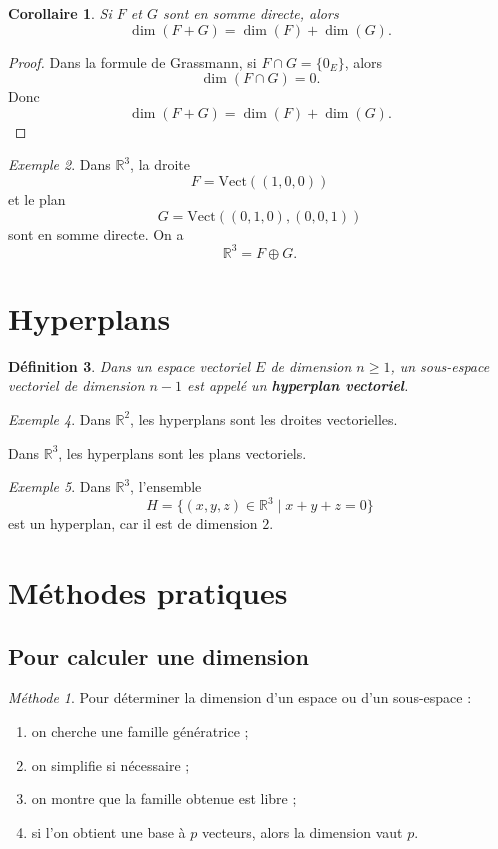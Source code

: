 \documentclass[11pt,a4paper]{article}
\newtheorem{definition}{Définition}[section]
\newtheorem{corollaire}[definition]{Corollaire}
\theoremstyle{remark}
\newtheorem{exemple}[definition]{Exemple}
\newtheorem*{methode}{Méthode}
\newcommand{\R}{\mathbb{R}}
\newcommand{\Vect}{\mathrm{Vect}}
\begin{document}
\begin{corollaire}
Si \(F\) et \(G\) sont en somme directe, alors
\[
\dim(F+G)=\dim(F)+\dim(G).
\]
\end{corollaire}

\begin{proof}
Dans la formule de Grassmann, si \(F\cap G=\{0_E\}\), alors
\[
\dim(F\cap G)=0.
\]
Donc
\[
\dim(F+G)=\dim(F)+\dim(G).
\]
\end{proof}

\begin{exemple}
Dans \(\R^3\), la droite
\[
F=\Vect((1,0,0))
\]
et le plan
\[
G=\Vect((0,1,0),(0,0,1))
\]
sont en somme directe. On a
\[
\R^3=F\oplus G.
\]
\end{exemple}

\section{Hyperplans}

\begin{definition}
Dans un espace vectoriel \(E\) de dimension \(n\ge 1\), un sous-espace vectoriel de dimension \(n-1\) est appelé un \textbf{hyperplan vectoriel}.
\end{definition}

\begin{exemple}
Dans \(\R^2\), les hyperplans sont les droites vectorielles.

Dans \(\R^3\), les hyperplans sont les plans vectoriels.
\end{exemple}

\begin{exemple}
Dans \(\R^3\), l’ensemble
\[
H=\{(x,y,z)\in\R^3\mid x+y+z=0\}
\]
est un hyperplan, car il est de dimension \(2\).
\end{exemple}

\section{Méthodes pratiques}

\subsection{Pour calculer une dimension}

\begin{methode}
Pour déterminer la dimension d’un espace ou d’un sous-espace :
\begin{enumerate}
    \item on cherche une famille génératrice ;
    \item on simplifie si nécessaire ;
    \item on montre que la famille obtenue est libre ;
    \item si l’on obtient une base à \(p\) vecteurs, alors la dimension vaut \(p\).
\end{enumerate}
\end{methode}
\end{document}
